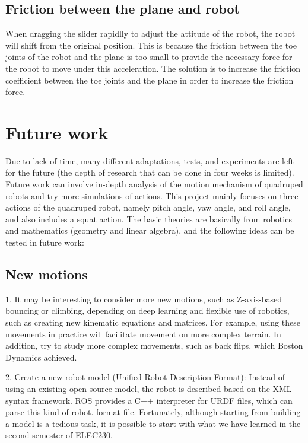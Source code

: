 \subsection{Friction between the plane and robot}

When dragging the slider rapidlly to adjust the attitude of the robot, the robot will shift from the original position. This is because the friction between the toe joints of the robot and the plane is too small to provide the necessary force for the robot to move under this acceleration. The solution is to increase the friction coefficient between the toe joints and the plane in order to increase the friction force.

\section{Future work}

Due to lack of time, many different adaptations, tests, and experiments are left for the future (the depth of research that can be done in four weeks is limited). Future work can involve in-depth analysis of
the motion mechanism of quadruped robots and try more simulations of actions.
This project mainly focuses on three actions of the quadruped robot, namely pitch angle, yaw angle, and roll angle, and also includes a squat action. The basic theories are basically from robotics and mathematics (geometry and linear algebra), and the following ideas can be tested in future work:

\subsection{New motions}

1. It may be interesting to consider more new motions, such as Z-axis-based bouncing or climbing, depending on deep learning and flexible use of robotics, such as creating new kinematic equations and matrices. For example, using these movements in practice will facilitate movement on more complex terrain. In addition, try to study more complex movements, such as back flips, which Boston Dynamics achieved.

2. Create a new robot model (Unified Robot Description Format): Instead of using an existing open-source model, the robot is described based on the XML syntax framework. ROS provides a C++ interpreter for URDF files, which can parse this kind of robot. format file. Fortunately, although starting from building a model is a tedious task, it is possible to start with what we have learned in the second semester of ELEC230.

